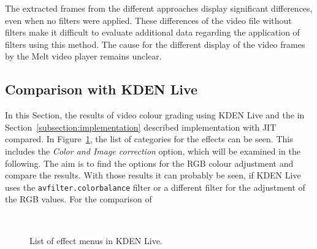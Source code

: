 \documentclass[../MasterThesis.tex]{subfiles}
\begin{document}
\vspace*{2em}
The extracted frames from the different approaches display significant differences, even when no filters were applied. 
These differences of the video file without filters make it difficult to evaluate additional data regarding the application of filters using this method. The cause for the different display of the video frames by the Melt video player remains unclear. 











\subsection{Comparison with KDEN Live} \label{section:comparisonKDENLive}


\begin{minipage}{0.48\textwidth}
	
	In this Section, the results of video colour grading using KDEN Live and the in Section~\ref{subsection:implementation} described implementation with JIT compared. In Figure~\ref{figure:kdenlive_effects}, the list of categories for the effects can be seen. This includes the \textit{Color and Image correction} option, which will be examined in the following. The aim is to find the options for the RGB colour adjustment and compare the results. With those results it can probably be seen, if KDEN Live uses the \texttt{avfilter.colorbalance} filter or a different filter for the adjustment of the RGB values. For the comparison of
	
	
\end{minipage}\begin{minipage}{0.04\textwidth}
	\ 
\end{minipage}\begin{minipage}{0.48\textwidth}
	\begin{figure}[H]
		\begin{center}
			\caption[List of effect menus in KDEN Live.]{List of effect menus in KDEN Live.}
			\label{figure:kdenlive_effects}
		\end{center}
	\end{figure}
	\hfill
\end{minipage}
\end{document}
